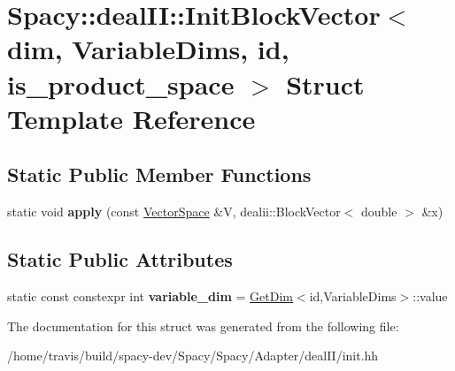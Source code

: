\hypertarget{structSpacy_1_1dealII_1_1InitBlockVector}{\section{Spacy\-:\-:deal\-I\-I\-:\-:Init\-Block\-Vector$<$ dim, Variable\-Dims, id, is\-\_\-product\-\_\-space $>$ Struct Template Reference}
\label{structSpacy_1_1dealII_1_1InitBlockVector}
}
\subsection*{Static Public Member Functions}
\begin{DoxyCompactItemize}
\item 
\hypertarget{structSpacy_1_1dealII_1_1InitBlockVector_a5bdd74274de8f6acd518b478f194cc74}{static void {\bfseries apply} (const \hyperlink{classSpacy_1_1VectorSpace}{Vector\-Space} \&V, dealii\-::\-Block\-Vector$<$ double $>$ \&x)}\label{structSpacy_1_1dealII_1_1InitBlockVector_a5bdd74274de8f6acd518b478f194cc74}

\end{DoxyCompactItemize}
\subsection*{Static Public Attributes}
\begin{DoxyCompactItemize}
\item 
\hypertarget{structSpacy_1_1dealII_1_1InitBlockVector_a966530a726e2f865fecbb7cc53c43b5e}{static const constexpr int {\bfseries variable\-\_\-dim} = \hyperlink{structSpacy_1_1dealII_1_1GetDim}{Get\-Dim}$<$id,Variable\-Dims$>$\-::value}\label{structSpacy_1_1dealII_1_1InitBlockVector_a966530a726e2f865fecbb7cc53c43b5e}

\end{DoxyCompactItemize}


The documentation for this struct was generated from the following file\-:\begin{DoxyCompactItemize}
\item 
/home/travis/build/spacy-\/dev/\-Spacy/\-Spacy/\-Adapter/deal\-I\-I/init.\-hh\end{DoxyCompactItemize}
